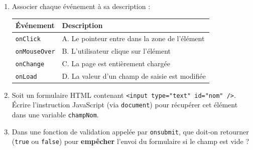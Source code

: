 \documentclass[11pt]{article}
\begin{document}
\begin{exercice}
\begin{enumerate}
    \item Associer chaque événement à sa description :
    \begin{tabular}{|l|l|}
    \hline
    \textbf{Événement} & \textbf{Description} \\
    \hline
    \texttt{onClick} & A. Le pointeur entre dans la zone de l'élément \\
    \texttt{onMouseOver} & B. L'utilisateur clique sur l'élément \\
    \texttt{onChange} & C. La page est entièrement chargée \\
    \texttt{onLoad} & D. La valeur d'un champ de saisie est modifiée \\
    \hline
    \end{tabular}
    \item Soit un formulaire HTML contenant \texttt{<input type="text" id="nom" />}. Écrire l'instruction JavaScript (via \texttt{document}) pour récupérer cet élément dans une variable \texttt{champNom}.
    \item Dans une fonction de validation appelée par \texttt{onsubmit}, que doit-on retourner (\texttt{true} ou \texttt{false}) pour \textbf{empêcher} l'envoi du formulaire si le champ est vide ?
\end{enumerate}
\end{exercice}
\end{document}
